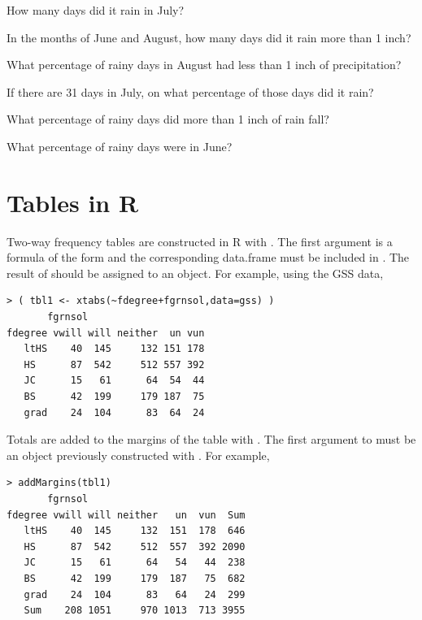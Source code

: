 \documentclass[10pt,openany]{book}\usepackage[]{graphicx}\usepackage[]{color}
\makeatletter
\newenvironment{kframe}{%
 \def\at@end@of@kframe{}%
 \ifinner\ifhmode%
  \def\at@end@of@kframe{\end{minipage}}%
  \begin{minipage}{\columnwidth}%
 \fi\fi%
 \def\FrameCommand##1{\hskip\@totalleftmargin \hskip-\fboxsep
 \colorbox{shadecolor}{##1}\hskip-\fboxsep
     \hskip-\linewidth \hskip-\@totalleftmargin \hskip\columnwidth}%
 \MakeFramed {\advance\hsize-\width
   \@totalleftmargin\z@ \linewidth\hsize
   \@setminipage}}%
 {\par\unskip\endMakeFramed%
 \at@end@of@kframe}
\newenvironment{knitrout}{}{} %
\makeatother
\begin{document}
\begin{exsection}
  \begin{Enumerate}
    \item How many days did it rain in July?
    \item In the months of June and August, how many days did it rain more than 1 inch?
    \item What percentage of rainy days in August had less than 1 inch of precipitation?
    \item If there are 31 days in July, on what percentage of those days did it rain?
    \item What percentage of rainy days did more than 1 inch of rain fall?
    \item What percentage of rainy days were in June?
  \end{Enumerate}
\end{exsection}

\section{Tables in R}  \label{sect:Tables2}
Two-way frequency tables are constructed in R with .  The first argument is a formula of the form  and the corresponding data.frame must be included in .  The result of  should be assigned to an object.  For example, using the GSS data,
\begin{knitrout}
\color{fgcolor}\begin{kframe}
\begin{verbatim}
> ( tbl1 <- xtabs(~fdegree+fgrnsol,data=gss) )
       fgrnsol
fdegree vwill will neither  un vun
   ltHS    40  145     132 151 178
   HS      87  542     512 557 392
   JC      15   61      64  54  44
   BS      42  199     179 187  75
   grad    24  104      83  64  24
\end{verbatim}
\end{kframe}
\end{knitrout}
Totals are added to the margins of the table with .  The first argument to  must be an object previously constructed with .  For example,
\begin{knitrout}
\color{fgcolor}\begin{kframe}
\begin{verbatim}
> addMargins(tbl1)
       fgrnsol
fdegree vwill will neither   un  vun  Sum
   ltHS    40  145     132  151  178  646
   HS      87  542     512  557  392 2090
   JC      15   61      64   54   44  238
   BS      42  199     179  187   75  682
   grad    24  104      83   64   24  299
   Sum    208 1051     970 1013  713 3955
\end{verbatim}
\end{kframe}
\end{knitrout}
\end{document}
